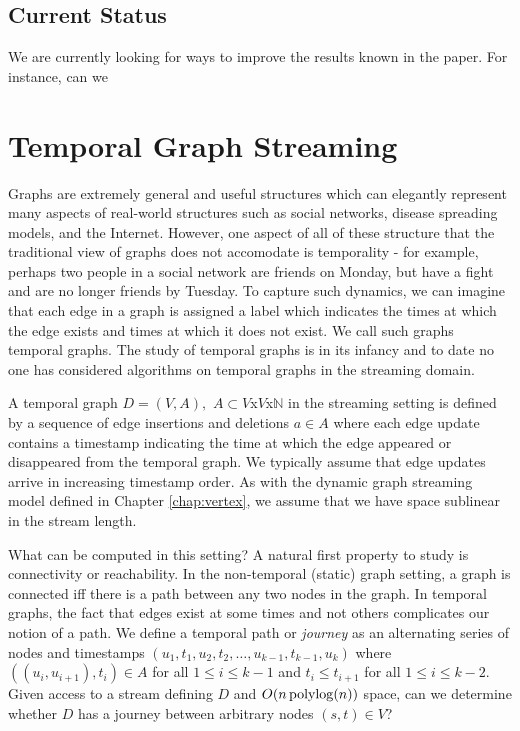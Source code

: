 \subsection{Current Status}
We are currently looking for ways to improve the results known in the paper.  For instance, can we 


\section{Temporal Graph Streaming}
\label{sec:tempgraph}

Graphs are extremely general and useful structures which can elegantly represent many aspects of real-world structures such as social networks, disease spreading models, and the Internet. However, one aspect of all of these structure that the traditional view of graphs does not accomodate is temporality - for example, perhaps two people in a social network are friends on Monday, but have a fight and are no longer friends by Tuesday.  To capture such dynamics, we can imagine that each edge in a graph is assigned a label which indicates the times at which the edge exists and times at which it does not exist.  We call such graphs temporal graphs.  The study of temporal graphs is in its infancy \cite{temporalsurvey} and to date no one has considered algorithms on temporal graphs in the streaming domain.

A temporal graph $D = (V, A),$ $A \subset V$x$V$x$\mathbb{N}$ in the streaming setting is defined by a sequence of edge insertions and deletions $a \in A$ where each edge update contains a timestamp indicating the time at which the edge appeared or disappeared from the temporal graph.  We typically assume that edge updates arrive in increasing timestamp order.  As with the dynamic graph streaming model defined in Chapter \ref{chap:vertex}, we assume that we have space sublinear in the stream length.

What can be computed in this setting?  A natural first property to study is connectivity or reachability.  In the non-temporal (static) graph setting, a graph is connected iff there is a path between any two nodes in the graph.  In temporal graphs, the fact that edges exist at some times and not others complicates our notion of a path.  We define a temporal path or \emph{journey}  as an alternating series of nodes and timestamps $(u_1, t_1, u_2, t_2, \dots, u_{k-1}, t_{k-1}, u_k)$ where $((u_i, u_{i+1}),t_i) \in A$ for all $ 1 \leq i \leq k-1$ and $t_i \leq t_{i+1}$ for all $1 \leq i \leq k-2$.  Given access to a stream defining $D$ and $O(n \operatorname{polylog}(n))$ space, can we determine whether $D$ has a journey between arbitrary nodes $(s,t) \in V$?

